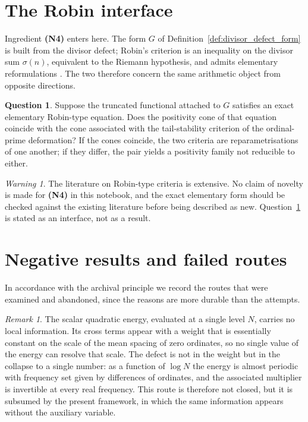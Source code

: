 \documentclass[11pt]{amsart}
\numberwithin{equation}{section}
\theoremstyle{plain}
\theoremstyle{definition}
\newtheorem{question}[theorem]{Question}
\theoremstyle{remark}
\newtheorem{remark}[theorem]{Remark}
\newtheorem{warning}[theorem]{Warning}
\begin{document}
\section{The Robin interface}
\label{sec:robin_interface}

Ingredient \textbf{(N4)} enters here. The form $G$ of
Definition~\ref{def:divisor_defect_form} is built from the divisor
defect; Robin's criterion \cite{Robin1984} is an inequality on the
divisor sum $\sigma(n)$, equivalent to the Riemann hypothesis, and
admits elementary reformulations \cite{Lagarias2002}. The two therefore
concern the same arithmetic object from opposite directions.

\begin{question}
\label{q:robin_cone_comparison}
Suppose the truncated functional attached to $G$ satisfies an exact
elementary Robin-type equation. Does the positivity cone of that
equation coincide with the cone associated with the tail-stability
criterion of the ordinal-prime deformation? If the cones coincide, the
two criteria are reparametrisations of one another; if they differ, the
pair yields a positivity family not reducible to either.
\end{question}

\begin{warning}
\label{warn:robin_novelty}
The literature on Robin-type criteria is extensive. No claim of novelty
is made for \textbf{(N4)} in this notebook, and the exact elementary
form should be checked against the existing literature before being
described as new. Question~\ref{q:robin_cone_comparison} is stated as an
interface, not as a result.
\end{warning}

\section{Negative results and failed routes}
\label{sec:negative_results}

In accordance with the archival principle we record the routes that
were examined and abandoned, since the reasons are more durable than
the attempts.

\begin{remark}
\label{rem:negative_result_energy_scalar}
The scalar quadratic energy, evaluated at a single level $N$, carries
no local information. Its cross terms appear with a weight that is
essentially constant on the scale of the mean spacing of zero
ordinates, so no single value of the energy can resolve that scale. The
defect is not in the weight but in the collapse to a single number: as
a function of $\log N$ the energy is almost periodic with frequency set
given by differences of ordinates, and the associated multiplier is
invertible at every real frequency. This route is therefore not closed,
but it is subsumed by the present framework, in which the same
information appears without the auxiliary variable.
\end{remark}
\end{document}
